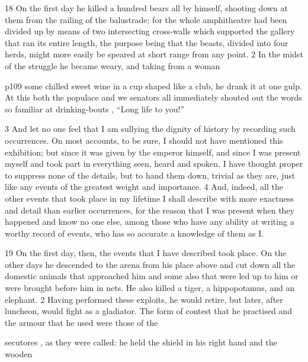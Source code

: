 18
On the first day he killed a hundred bears all by himself, shooting down at them from the railing of the balustrade; for the whole amphitheatre had been divided up by means of two intersecting cross-walls which supported the gallery that ran its entire length, the purpose being that the beasts, divided into four herds, might more easily be speared at short range from any point. 2 In the midst of the struggle he became weary, and taking from a woman

p109 some chilled sweet wine in a cup shaped like a club, he drank it at one gulp. At this both the populace and we senators all immediately shouted out the words so familiar at drinking-bouts , ``Long life to you!''

3
And let no one feel that I am sullying the dignity of history by recording such occurrences. On most accounts, to be sure, I should not have mentioned this exhibition; but since it was given by the emperor himself, and since I was present myself and took part in everything seen, heard and spoken, I have thought proper to suppress none of the details, but to hand them down, trivial as they are, just like any events of the greatest weight and importance. 4 And, indeed, all the other events that took place in my lifetime I shall describe with more exactness and detail than earlier occurrences, for the reason that I was present when they happened and know no one else, among those who have any ability at writing a worthy record of events, who has so accurate a knowledge of them as I.

19
On the first day, then, the events that I have described took place. On the other days he descended to the arena from his place above and cut down all the domestic animals that approached him and some also that were led up to him or were brought before him in nets. He also killed a tiger, a hippopotamus, and an elephant. 2 Having performed these exploits, he would retire, but later, after luncheon, would fight as a gladiator. The form of contest that he practised and the armour that he used were those of the

secutores , as they were called: he held the shield in his right hand and the wooden


